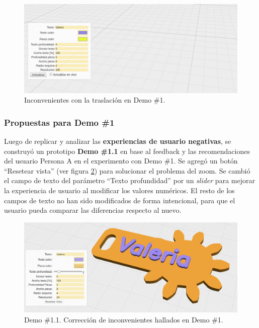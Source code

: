    \begin{figure}[h]
    \includegraphics[width=14cm]{Img/Desarrollo/feedback3.jpg}
    \centering
    \caption{\footnotesize{Inconvenientes con la traslación en Demo \#1. }}
     \label{fig:feedback2}
    \end{figure}




\subsubsection{Propuestas para Demo \#1}
Luego de replicar y analizar las \textbf{experiencias de usuario negativas},  se construyó un prototipo \textbf{Demo \#1.1} en base al feedback y las recomendaciones del usuario Persona A en el experimento con Demo \#1. Se agregó un botón ``Resetear vista'' (ver figura \ref{fig:feedback4}) para solucionar el problema del zoom. Se cambió el campo de texto del parámetro ``Texto profundidad'' por un  \textit{slider} para mejorar la experiencia de usuario al modificar los valores numéricos. El resto de los campos de texto no han sido modificados de forma intencional, para que el usuario pueda comparar las diferencias respecto al nuevo.


\begin{figure}[ht]
    \includegraphics[width=14cm]{Img/Desarrollo/feedback4.jpg}
    \centering
    \caption{\footnotesize{Demo \#1.1. Corrección de inconvenientes hallados en Demo \#1.  }}
    \label{fig:feedback4}
\end{figure}



